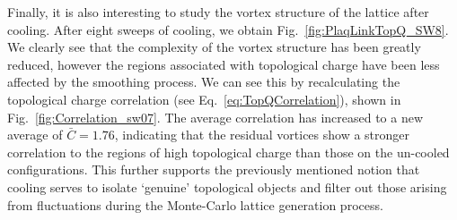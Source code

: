 Finally, it is also interesting to study the vortex structure of the lattice after cooling. After eight sweeps of cooling, we obtain Fig.~\ref{fig:PlaqLinkTopQ_SW8}. We clearly see that the complexity of the vortex structure has been greatly reduced, however the regions associated with topological charge have been less affected by the smoothing process. We can see this by recalculating the topological charge correlation (see Eq.~\eqref{eq:TopQCorrelation}), shown in Fig.~\ref{fig:Correlation_sw07}. The average correlation has increased to a new average of $\bar{C}=1.76$, indicating that the residual vortices show a stronger correlation to the regions of high topological charge than those on the un-cooled configurations. This further supports the previously mentioned notion that cooling serves to isolate `genuine' topological objects and filter out those arising from fluctuations during the Monte-Carlo lattice generation process.

